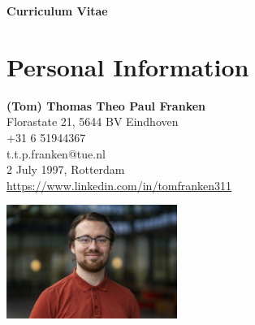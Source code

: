 \documentclass[11pt]{article}
\begin{document}
	\begin{figure}[h]
		\begin{subfigure}[t]{0.65\textwidth}
			\vskip 0pt
			\textbf{\Huge{Curriculum Vitae}} \hfill \textit{\color{Blue}{\Large{\today}}}\\
			\section*{Personal Information}
			\textit{\color{Blue}{Name}} \hfill \textbf{(Tom) Thomas Theo Paul Franken}\\
			\textit{\color{Blue}{Address}} \hfill Florastate 21, 5644 BV Eindhoven\\
			\textit{\color{Blue}{Phone}} \hfill +31 6 51944367\\
			\textit{\color{Blue}{Mail Address}} \hfill t.t.p.franken@tue.nl\\
			\textit{\color{Blue}{Birth Date \& Place}} \hfill 2 July 1997, Rotterdam\\
			\textit{\color{Blue}{LinkedIn}} \hfill \href{https://www.linkedin.com/in/tomfranken311}{https://www.linkedin.com/in/tomfranken311}
		\end{subfigure}
		\begin{subfigure}[t]{0.35\textwidth}
			\vskip 0pt
			\includegraphics[height=140px, right, trim={4cm 0 6cm 0},clip]{Tom Franken.jpg}
		\end{subfigure}
	\end{figure}
\end{document}
